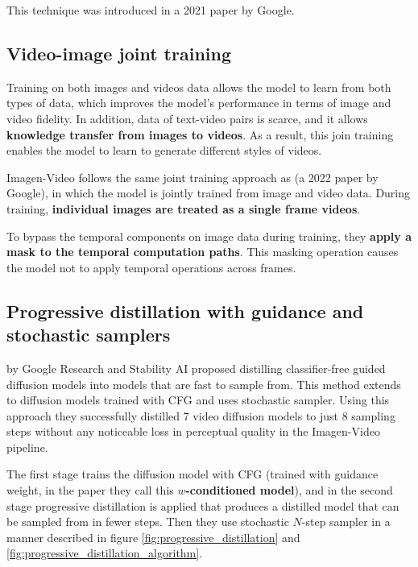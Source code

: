 This technique was introduced in a 2021 paper \cite{cascaded_diffusion_models} by Google.











\subsection{Video-image joint training}

Training on both images and videos data allows the model to learn from both types of data, which improves the model's performance in terms of image and video fidelity. In addition, data of text-video pairs is scarce, and it allows \textbf{knowledge transfer from images to videos}. As a result, this join training enables the model to learn to generate different styles of videos.

Imagen-Video follows the same joint training approach as \cite{video_diffusion_models} (a 2022 paper by Google), in which the model is jointly trained from image and video data. During training, \textbf{individual images are treated as a single frame videos}.

To bypass the temporal components on image data during training, they \textbf{apply a mask to the temporal computation paths}. This masking operation causes the model not to apply temporal operations across frames.











\subsection{Progressive distillation with guidance and stochastic samplers}

\cite{meng2023distillation} by Google Research and Stability AI proposed distilling classifier-free guided diffusion models into models that are fast to sample from. This method extends to diffusion models trained with CFG and uses stochastic sampler. Using this approach they successfully distilled 7 video diffusion models to just 8 sampling steps without any noticeable loss in perceptual quality in the Imagen-Video pipeline.

The first stage trains the diffusion model with CFG (trained with guidance weight, in the paper \cite{meng2023distillation} they call this \textbf{$w$-conditioned model}), and in the second stage progressive distillation is applied that produces a distilled model that can be sampled from in fewer steps. Then they use stochastic $N$-step sampler in a manner described in figure \ref{fig:progressive_distillation} and \ref{fig:progressive_distillation_algorithm}.












